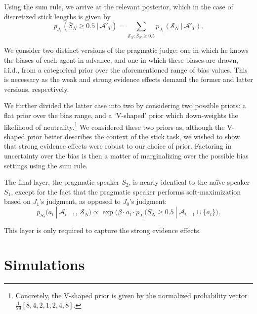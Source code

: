 \documentclass[10pt,letterpaper]{article}
\begin{document}
Using the sum rule, we arrive at the relevant posterior, which in the case of discretized stick lengths is given by
\begin{equation}
	p_{J_1} ( \bar{S}_N \ge 0.5 \ | \ \mathcal{A}'_T ) = \sum_{\mathcal{S}_N \colon \bar{S}_N \ge 0.5} p_{J_1} (\mathcal{S}_N \ | \ \mathcal{A}'_T).
\end{equation}

We consider two distinct versions of the pragmatic judge: one in which he knows the biases of each agent in advance, and
one in which these biases are drawn, i.i.d., from a categorical prior over the aforementioned range of bias values. This is 
necessary as the weak and strong evidence effects demand the former and latter versions, respectively. 

We further divided the latter case into two by considering two possible priors: a flat prior over the bias range, and a `V-shaped' prior which down-weights 
the likelihood of neutrality.\footnote{Concretely, the V-shaped prior is given by the normalized probability vector $\frac{1}{29} [8, 4, 2, 1, 2, 4, 8]$.} 
We considered these two priors as, although the V-shaped prior better describes the context of the stick task, we wished to show 
that strong evidence effects were robust to our choice of prior. Factoring in uncertainty over the bias is then a matter of 
marginalizing over the possible bias settings using the sum rule.

The final layer, the pragmatic speaker $S_2$, is nearly identical to the na\"ive speaker $S_1$, except for the fact that
the pragmatic speaker performs soft-maximization based on $J_1$'s judgment, as opposed to $J_0$'s judgment:
\begin{equation}
	p_{S_2} (a_t \ | \ \mathcal{A}_{t-1},\ \mathcal{S}_N) \propto \exp \bigl(\beta \cdot a_t \cdot p_{J_1} (\bar{S}_N \ge 0.5 \ | \ \mathcal{A}_{t-1} \cup \{a_t\} \bigr).
\end{equation}

This layer is only required to capture the strong evidence effects.

\section{Simulations}
\end{document}
